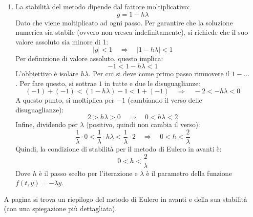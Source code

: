 \begin{enumerate}
\begin{enumerate}
        \item La stabilità del metodo dipende dal fattore moltiplicativo:
        \begin{equation*}
            g = 1 - h\lambda
        \end{equation*}
        Dato che viene moltiplicato ad ogni passo. Per garantire che la soluzione numerica sia stabile (ovvero non cresca indefinitamente), si richiede che il suo valore assoluto sia minore di 1:
        \begin{equation*}
            |g| < 1 \quad \Rightarrow \quad |1 - h\lambda| < 1
        \end{equation*}
        Per definizione di valore assoluto, questo implica:
        \begin{equation*}
            -1 < 1 - h\lambda < 1
        \end{equation*}
        L'obbiettivo è isolare $h \lambda$. Per cui si deve come primo passo rimuovere il $1 - \dots$. Per fare questo, si sottrae $1$ in tutte e due le disuguaglianze:
        \begin{equation*}
            \left(-1\right) + \left(-1\right) < \left(1 - h\lambda\right) - 1 < 1 + \left(- 1\right) \quad \Rightarrow \quad -2 < - h\lambda < 0
        \end{equation*}
        A questo punto, si moltiplica per $-1$ (cambiando il verso delle disuguaglianze):
        \begin{equation*}
            2 > h\lambda > 0 \quad \Rightarrow \quad 0 < h\lambda < 2
        \end{equation*}
        Infine, dividendo per $\lambda$ (positivo, quindi non cambia il verso):
        \begin{equation*}
            \dfrac{1}{\lambda} \cdot 0 < \dfrac{1}{\lambda} \cdot h\lambda < \dfrac{1}{\lambda} \cdot 2 \quad \Rightarrow \quad 0 < h < \dfrac{2}{\lambda}
        \end{equation*}
        Quindi, la condizione di stabilità per il metodo di Eulero in avanti è:
        \begin{equation*}
            0 < h < \dfrac{2}{\lambda}
        \end{equation*}
        Dove $h$ è il passo scelto per l'iterazione e $\lambda$ è il parametro della funzione $f(t, y) = -\lambda y$.
    \end{enumerate}
    A pagina  si trova un riepilogo del metodo di Eulero in avanti e della sua stabilità (con una spiegazione più dettagliata).



\end{enumerate}
